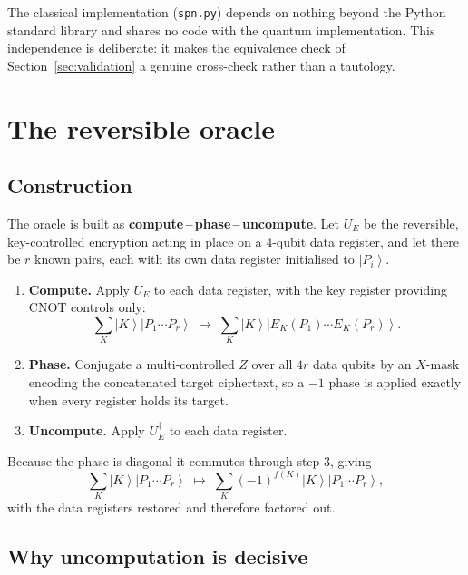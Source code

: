 \documentclass[11pt,a4paper]{article}
\newcommand{\ket}[1]{\left|#1\right\rangle}
\newcommand{\Ek}{E_K}
\begin{document}
The classical implementation (\texttt{spn.py}) depends on nothing beyond the
Python standard library and shares no code with the quantum implementation.
This independence is deliberate: it makes the equivalence check of
Section~\ref{sec:validation} a genuine cross-check rather than a tautology.

\section{The reversible oracle}
\label{sec:oracle}

\subsection{Construction}

The oracle is built as \textbf{compute\,--\,phase\,--\,uncompute}. Let $U_E$ be
the reversible, key-controlled encryption acting in place on a 4-qubit data
register, and let there be $r$ known pairs, each with its own data register
initialised to $\ket{P_i}$.

\begin{enumerate}
  \item \textbf{Compute.} Apply $U_E$ to each data register, with the key
        register providing CNOT controls only:
        \[
          \sum_K \ket{K}\ket{P_1 \cdots P_r}
          \;\longmapsto\;
          \sum_K \ket{K}\ket{\Ek(P_1) \cdots \Ek(P_r)}.
        \]
  \item \textbf{Phase.} Conjugate a multi-controlled $Z$ over all $4r$ data
        qubits by an $X$-mask encoding the concatenated target ciphertext, so a
        $-1$ phase is applied exactly when every register holds its target.
  \item \textbf{Uncompute.} Apply $U_E^\dagger$ to each data register.
\end{enumerate}

Because the phase is diagonal it commutes through step 3, giving
\begin{equation}
  \sum_K \ket{K}\ket{P_1 \cdots P_r}
  \;\longmapsto\;
  \sum_K (-1)^{f(K)} \ket{K}\ket{P_1 \cdots P_r},
\end{equation}
with the data registers restored and therefore factored out.

\subsection{Why uncomputation is decisive}
\end{document}
